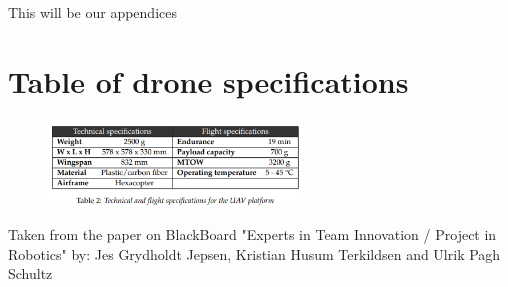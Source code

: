 \documentclass[../Head/Main.tex]{subfiles}
\begin{document}
\begin{appendices}
This will be our appendices    


\section{Table of drone specifications}
\label{app:drone_specifications}

\begin{figure}[H]
    \centering
    \includegraphics[width=0.6\textwidth]{../Figures/table2.png}
    \label{fig:drone_specs}
\end{figure}
Taken from the paper on BlackBoard "Experts in Team Innovation / Project in Robotics" by: Jes Grydholdt Jepsen, Kristian Husum Terkildsen and Ulrik Pagh Schultz


\end{appendices}
\end{document}
